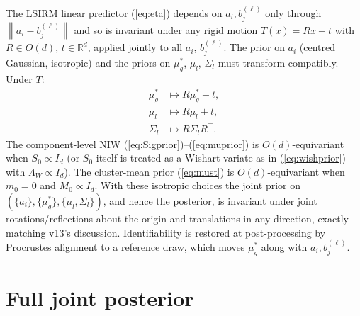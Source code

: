 \documentclass[11pt]{article}
\newcommand{\R}{\mathbb{R}}
\newcommand{\norm}[1]{\left\lVert #1 \right\rVert}
\newcommand{\trans}{^{\top}}
\begin{document}
The LSIRM linear predictor (\ref{eq:eta}) depends on $a_i,b_j^{(\ell)}$
only through $\norm{a_i - b_j^{(\ell)}}$ and so is invariant under any
rigid motion $T(x)=Rx+t$ with $R\in O(d)$, $t\in\R^d$, applied jointly
to all $a_i$, $b_j^{(\ell)}$. The prior on $a_i$ (centred Gaussian,
isotropic) and the priors on
$\mu_g^*$, $\mu_l$, $\Sigma_l$ must transform compatibly. Under
$T$:
\begin{align*}
\mu_g^*&\mapsto R\mu_g^*+t,\\
\mu_l  &\mapsto R\mu_l + t,\\
\Sigma_l&\mapsto R\Sigma_l R\trans.
\end{align*}
The component-level NIW (\ref{eq:Sigprior})--(\ref{eq:muprior}) is
$O(d)$-equivariant when $S_0\propto I_d$ (or $S_0$ itself is treated as a
Wishart variate as in (\ref{eq:wishprior}) with $\Lambda_W\propto I_d$).
The cluster-mean prior (\ref{eq:must}) is $O(d)$-equivariant when
$m_0=0$ and $M_0\propto I_d$. With these isotropic choices the joint
prior on $(\{a_i\},\{\mu_g^*\},\{\mu_l,\Sigma_l\})$, and hence the
posterior, is invariant under joint rotations/reflections about the
origin and translations in any direction, exactly matching v13's
discussion. Identifiability is restored at post-processing by
Procrustes alignment to a reference draw, which moves $\mu_g^*$ along
with $a_i,b_j^{(\ell)}$.

\section{Full joint posterior}
\label{sec:joint}
\end{document}
